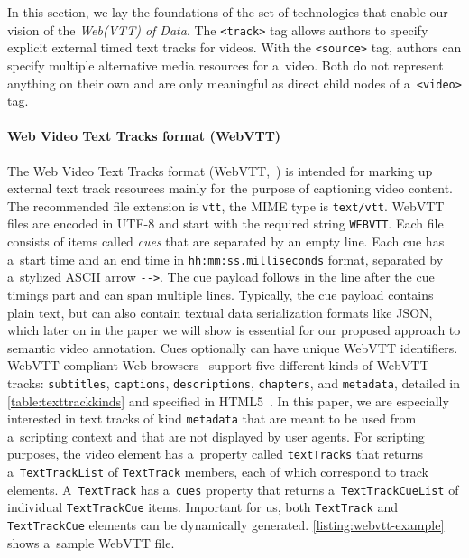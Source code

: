 \documentclass{sig-alternate-ceur}
\begin{document}
In this section, we lay the foundations of the set of technologies
that enable our vision of the \emph{Web(VTT) of Data}.
The \texttt{<track>} tag allows authors to specify explicit
external timed text tracks for videos.
With the \texttt{<source>} tag, authors can specify
multiple alternative media resources for a~video.
Both do not represent anything on their own
and are only meaningful as direct child nodes of a~\texttt{<video>} tag.

\paragraph{Web Video Text Tracks format (WebVTT)}

The Web Video Text Tracks format (WebVTT,~\cite{pfeiffer2013webvtt})
is intended for marking up external text track resources mainly
for the purpose of captioning video content.
The recommended file extension is \texttt{vtt},
the MIME type is \texttt{text/vtt}.
WebVTT files are encoded in UTF-8 and
start with the required string \texttt{WEBVTT}.
Each file consists of items called \emph{cues}
that are separated by an empty line.
Each cue has a~start time and an end time in
\texttt{hh:mm:ss.milliseconds} format,
separated by a~stylized ASCII arrow \texttt{-}\texttt{->}.
The cue payload follows in the line after the cue timings part
and can span multiple lines.
Typically, the cue payload contains plain text,
but can also contain textual data serialization formats like JSON,
which later on in the paper we will show is essential
for our proposed approach to semantic video annotation.
Cues optionally can have unique WebVTT identifiers.
WebVTT-compliant Web browsers~\cite{dutton2012trackelement}
support five different kinds of
WebVTT tracks: \texttt{subtitles}, \texttt{captions},
\texttt{descriptions}, \texttt{chapters}, and \texttt{metadata},
detailed in \autoref{table:texttrackkinds}
and specified in HTML5~\cite{berjon2013html5}.
In this paper, we are especially interested in
text tracks of kind \texttt{metadata}
that are meant to be used from a~scripting context and
that are not displayed by user agents.
For scripting purposes, the video element
has a~property called \texttt{textTracks}
that returns a~\texttt{TextTrackList} of
\texttt{TextTrack} members, each of which correspond
to track elements.
A~\texttt{TextTrack} has a~\texttt{cues} property
that returns a~\texttt{TextTrackCueList} of individual
\texttt{TextTrackCue} items.
Important for us, both \texttt{TextTrack} and
\texttt{TextTrackCue} elements
can be dynamically generated.
\autoref{listing:webvtt-example} shows a~sample WebVTT file.
\end{document}
